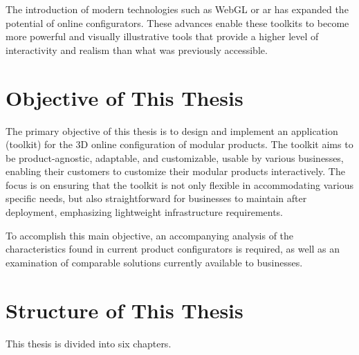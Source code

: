 The introduction of modern technologies such as WebGL or  \acrfull{ar} has expanded the potential of online configurators. These advances enable these toolkits to become more powerful and visually illustrative tools that provide a higher level of interactivity and realism than what was previously accessible. \cite{Cozzi2015}

\section*{Objective of This Thesis}

The primary objective of this thesis is to design and implement an application (toolkit) for the 3D online configuration of modular products. The toolkit aims to be product-agnostic, adaptable, and customizable, usable by various businesses, enabling their customers to customize their modular products interactively. The focus is on ensuring that the toolkit is not only flexible in accommodating various specific needs, but also straightforward for businesses to maintain after deployment, emphasizing lightweight infrastructure requirements. 

To accomplish this main objective, an accompanying analysis of the characteristics found in current product configurators is required, as well as an examination of comparable solutions currently available to businesses.

\section*{Structure of This Thesis}

This thesis is divided into six chapters.

